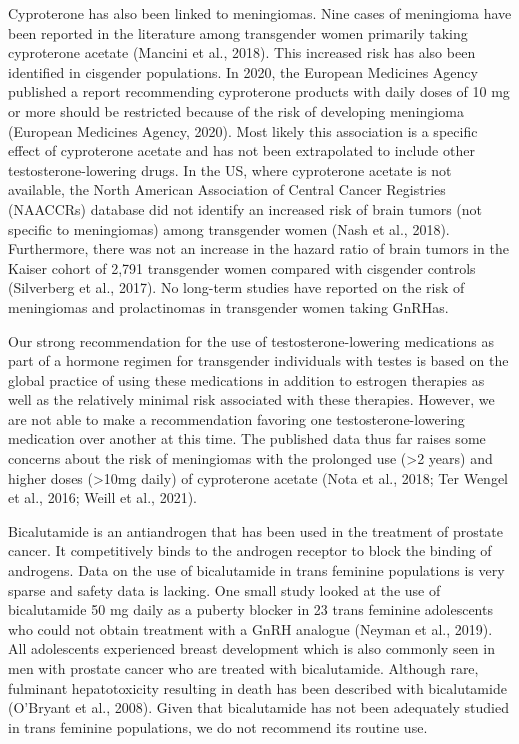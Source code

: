 \documentclass[
]{book}
\begin{document}
Cyproterone has also been linked to meningiomas. Nine cases of meningioma have been
reported in the literature among transgender
women primarily taking cyproterone acetate
(Mancini et al., 2018). This increased risk has also
been identified in cisgender populations. In 2020,
the European Medicines Agency published a report
recommending cyproterone products with daily
doses of 10 mg or more should be restricted
because of the risk of developing meningioma
(European Medicines Agency, 2020). Most likely
this association is a specific effect of cyproterone
acetate and has not been extrapolated to include
other testosterone-lowering drugs. In the US,
where cyproterone acetate is not available, the
North American Association of Central Cancer
Registries (NAACCRs) database did not identify
an increased risk of brain tumors (not specific to
meningiomas) among transgender women (Nash
et al., 2018). Furthermore, there was not an
increase in the hazard ratio of brain tumors in
the Kaiser cohort of 2,791 transgender women
compared with cisgender controls (Silverberg et al.,
2017). No long-term studies have reported on the
risk of meningiomas and prolactinomas in transgender women taking GnRHas.

Our strong recommendation for the use of
testosterone-lowering medications as part of a
hormone regimen for transgender individuals
with testes is based on the global practice of
using these medications in addition to estrogen
therapies as well as the relatively minimal risk
associated with these therapies. However, we are
not able to make a recommendation favoring
one testosterone-lowering medication over
another at this time. The published data thus
far raises some concerns about the risk of
meningiomas with the prolonged use (\textgreater2 years)
and higher doses (\textgreater10mg daily) of cyproterone
acetate (Nota et al., 2018; Ter Wengel et al.,
2016; Weill et al., 2021).

Bicalutamide is an antiandrogen that has been
used in the treatment of prostate cancer. It competitively binds to the androgen receptor to block
the binding of androgens. Data on the use of
bicalutamide in trans feminine populations is
very sparse and safety data is lacking. One small
study looked at the use of bicalutamide 50 mg
daily as a puberty blocker in 23 trans feminine
adolescents who could not obtain treatment with
a GnRH analogue (Neyman et al., 2019). All adolescents experienced breast development which is
also commonly seen in men with prostate cancer
who are treated with bicalutamide. Although rare,
fulminant hepatotoxicity resulting in death has
been described with bicalutamide (O'Bryant et al.,
2008). Given that bicalutamide has not been adequately studied in trans feminine populations, we
do not recommend its routine use.
\end{document}
